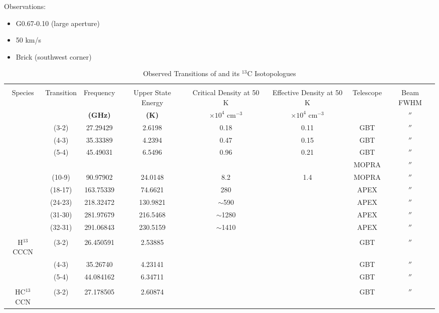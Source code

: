 Observations:
\begin{itemize}
\item G0.67-0.10 (large aperture)
\item 50 km/s 
\item Brick (southwest corner)
\end{itemize}

\begin{table}[ht]
\caption{Observed Transitions of \cyano and its $^{13}$C Isotopologues} 
\centering
\begin{tabular}{cccccccc}
\\[0.5ex]
\hline\hline
& & & & & & &\\
Species & Transition & Frequency & Upper State Energy & Critical Density at 50 K  & Effective Density at 50 K\footnotemark[1]  & Telescope & Beam FWHM \\ [0.5ex]
\hline
				& 		& {\bf (GHz)} 	& {\bf (K)} 		&$\times 10^{4}$ cm$^{-3}$ & $\times 10^{4}$ cm$^{-3}$ & & $''$\\
\cyano   			& (3-2)  	&   27.29429 	&     2.6198 	& 0.18 		& 0.11 	& GBT 		& $''$ \\
				& (4-3)    	&   35.33389 	&     4.2394 	& 0.47 		& 0.15 	& GBT 		& $''$ \\
				& (5-4)    	&   45.49031 	&     6.5496 	& 0.96 		& 0.21 	& GBT 		& $''$ \\
				&		&  		    	&   			& 			&		& MOPRA 	& $''$ \\
				& (10-9)    &   90.97902	&   24.0148	& 8.2 		& 1.4 	& MOPRA 	& $''$ \\
				& (18-17)  & 163.75339   	&   74.6621	& 280		&		& APEX 		& $''$ \\
				& (24-23)  & 218.32472	& 130.9821	& $\sim$590	&		& APEX 		& $''$ \\
				& (31-30) 	& 281.97679	& 216.5468	& $\sim$1280	&		& APEX 		& $''$ \\
				& (32-31)  & 291.06843	& 230.5159	& $\sim$1410	&		& APEX 		& $''$ \\
				& & & & & & &  \\
\hline
H$^{13}$CCCN		& (3-2) 	& 26.450591	& 2.53885 	&			& 		& GBT 		& $''$ \\
				& (4-3)  	& 35.26740	& 4.23141		&			&		& GBT 		& $''$ \\
				& (5-4)     	& 44.084162	& 6.34711		&			&		& GBT 		& $''$ \\
				& & & & & & &  \\
\hline
HC$^{13}$CCN 	& (3-2)  	& 27.178505 	& 2.60874 	&			&		& GBT 		& $''$ \\

\end{tabular}
\end{table}
